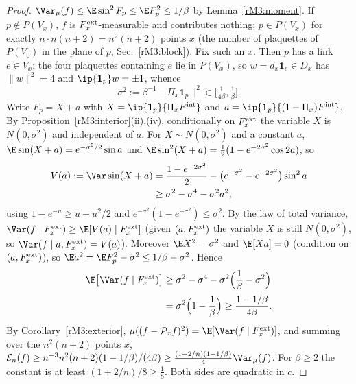 \begin{proof}
$\Var_\mu(f)\le\E\sin^2F_p\le\E F_p^2\le1/\beta$ by Lemma~\ref{rM3:moment}.
If $p\notin P(V_x)$, $f$ is $F^{\rm ext}_x$-measurable and contributes
nothing; $p\in P(V_x)$ for exactly $n\cdot n(n+2)=n^2(n+2)$ points $x$ (the
number of plaquettes of $P(V_0)$ in the plane of $p$,
Sec.~\ref{rM3:block}). Fix such an $x$. Then $p$ has a link $e\in V_x$; the
four plaquettes containing $e$ lie in $P(V_x)$, so $w=d_x\mathbf 1_e\in D_x$
has $\lVert w\rVert^2=4$ and $\ip{\mathbf 1_p}w=\pm1$, whence
\[
\sigma^2:=\beta^{-1}\lVert\Pi_x\mathbf 1_p\rVert^2\in\bigl[\tfrac1{4\beta},
\tfrac1\beta\bigr].
\]
Write $F_p=X+a$ with $X=\ip{\mathbf 1_p}{\Pi_xF^{\rm int}}$ and $a=\ip{\mathbf
1_p}{(1-\Pi_x)F^{\rm int}}$. By Proposition~\ref{rM3:interior}(ii),(iv),
conditionally on $F^{\rm ext}_x$ the variable $X$ is $N(0,\sigma^2)$ and
independent of $a$. For $X\sim N(0,\sigma^2)$ and a constant $a$,
$\E\sin(X+a)=e^{-\sigma^2/2}\sin a$ and $\E\sin^2(X+a)=\frac12(1-e^{-2
\sigma^2}\cos2a)$, so
\begin{align*}
V(a):=\Var\sin(X+a)&=\frac{1-e^{-2\sigma^2}}2-\bigl(e^{-\sigma^2}-e^{-2\sigma^2}
\bigr)\sin^2a\\
&\ge\sigma^2-\sigma^4-\sigma^2a^2,
\end{align*}
using $1-e^{-u}\ge u-u^2/2$ and $e^{-\sigma^2}(1-e^{-\sigma^2})\le\sigma^2$.
By the law of total variance, $\Var(f\mid F^{\rm ext}_x)\ge\E[V(a)\mid
F^{\rm ext}_x]$ (given $(a,F^{\rm ext}_x)$ the variable $X$ is still
$N(0,\sigma^2)$, so $\Var(f\mid a,F^{\rm ext}_x)=V(a)$). Moreover $\E X^2=
\sigma^2$ and $\E[Xa]=0$ (condition on $(a,F^{\rm ext}_x)$), so $\E a^2=
\E F_p^2-\sigma^2\le1/\beta-\sigma^2$. Hence
\begin{align*}
\E\bigl[\Var(f\mid F^{\rm ext}_x)\bigr]&\ge\sigma^2-\sigma^4-\sigma^2
\Bigl(\frac1\beta-\sigma^2\Bigr)\\
&=\sigma^2\Bigl(1-\frac1\beta\Bigr)\ge\frac{1-1/\beta}{4\beta}.
\end{align*}
By Corollary~\ref{rM3:exterior}, $\mu((f-\mathcal P_xf)^2)=\E[\Var(f\mid
F^{\rm ext}_x)]$, and summing over the $n^2(n+2)$ points $x$,
$\mathcal E_n(f)\ge n^{-3}n^2(n+2)(1-1/\beta)/(4\beta)\ge\frac{(1+2/n)(1-
1/\beta)}4\Var_\mu(f)$. For $\beta\ge2$ the constant is at least
$(1+2/n)/8\ge\frac18$. Both sides are quadratic in $c$.
\end{proof}

